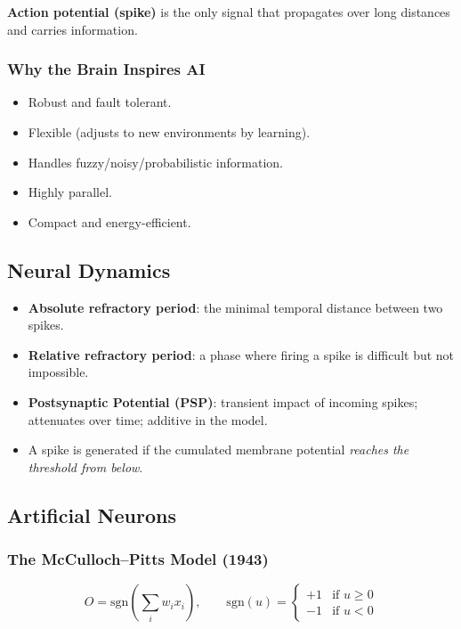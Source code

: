 \documentclass[11pt,a4paper]{article}
\newcommand{\sgn}{\text{sgn}}
\begin{document}
\textbf{Action potential (spike)} is the only signal that propagates over long distances and carries information.

\subsubsection{Why the Brain Inspires AI}

\begin{itemize}[leftmargin=*]
    \item Robust and fault tolerant.
    \item Flexible (adjusts to new environments by learning).
    \item Handles fuzzy/noisy/probabilistic information.
    \item Highly parallel.
    \item Compact and energy-efficient.
\end{itemize}

\subsection{Neural Dynamics}

\begin{itemize}[leftmargin=*]
    \item \textbf{Absolute refractory period}: the minimal temporal distance between two spikes.
    \item \textbf{Relative refractory period}: a phase where firing a spike is difficult but not impossible.
    \item \textbf{Postsynaptic Potential (PSP)}: transient impact of incoming spikes; attenuates over time; additive in the model.
    \item A spike is generated if the cumulated membrane potential \emph{reaches the threshold from below}.
\end{itemize}

\subsection{Artificial Neurons}

\subsubsection{The McCulloch--Pitts Model (1943)}

\begin{definitionbox}[title=McCulloch--Pitts Neuron]
\[
O = \sgn\!\left(\sum_i w_i x_i\right), \qquad \sgn(u) =
\begin{cases}
+1 & \text{if } u \geq 0\\
-1 & \text{if } u < 0
\end{cases}
\]
\end{definitionbox}
\end{document}
